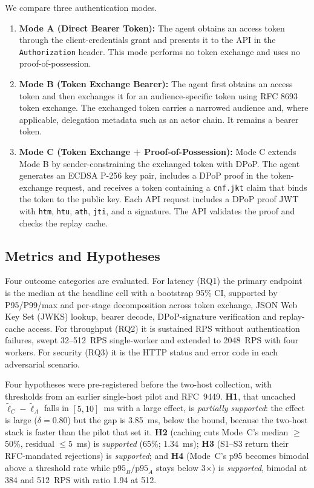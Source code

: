 \documentclass[conference]{IEEEtran}
\begin{document}
We compare three authentication modes.
\begin{enumerate}
\item \textbf{Mode A (Direct Bearer Token):}
The agent obtains an access token through the client-credentials grant and presents it to the API in the \texttt{Authorization} header. This mode performs no token exchange and uses no proof-of-possession.

\item \textbf{Mode B (Token Exchange Bearer):}
The agent first obtains an access token and then exchanges it for an audience-specific token using RFC 8693 token exchange. The exchanged token carries a narrowed audience and, where applicable, delegation metadata such as an actor chain. It remains a bearer token.

\item \textbf{Mode C (Token Exchange + Proof-of-Possession):}
Mode C extends Mode B by sender-constraining the exchanged token with DPoP. The agent generates an ECDSA P-256 key pair, includes a DPoP proof in the token-exchange request, and receives a token containing a \texttt{cnf.jkt} claim that binds the token to the public key. Each API request includes a DPoP proof JWT with \texttt{htm}, \texttt{htu}, \texttt{ath}, \texttt{jti}, and a signature. The API validates the proof and checks the replay cache.
\end{enumerate}

\subsection{Metrics and Hypotheses}
\label{subsec:metrics}

Four outcome categories are evaluated. For latency (RQ1) the primary endpoint is the median at the headline cell with a bootstrap 95\% CI, supported by P95/P99/max and per-stage decomposition across token exchange, JSON Web Key Set (JWKS) lookup, bearer decode, DPoP-signature verification and replay-cache access. For throughput (RQ2) it is sustained RPS without authentication failures, swept 32--512~RPS single-worker and extended to 2048~RPS with four workers. For security (RQ3) it is the HTTP status and error code in each adversarial scenario.

Four hypotheses were pre-registered before the two-host collection, with thresholds from an earlier single-host pilot and RFC~9449. \textbf{H1}, that uncached $\tilde{\ell}_C - \tilde{\ell}_A$ falls in $[5,10]$~ms with a large effect, is \emph{partially supported}: the effect is large ($\delta = 0.80$) but the gap is 3.85~ms, below the bound, because the two-host stack is faster than the pilot that set it. \textbf{H2} (caching cuts Mode~C's median $\ge$50\%, residual $\le 5$~ms) is \emph{supported} (65\%; 1.34~ms); \textbf{H3} (S1--S3 return their RFC-mandated rejections) is \emph{supported}; and \textbf{H4} (Mode~C's p95 becomes bimodal above a threshold rate while $\mathrm{p95}_B/\mathrm{p95}_A$ stays below 3$\times$) is \emph{supported}, bimodal at 384 and 512~RPS with ratio 1.94 at 512.
\end{document}
